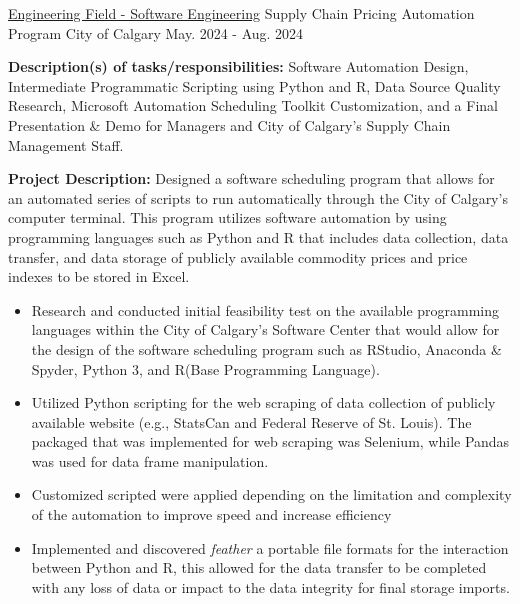 \begin{cventries}
  \cventry
    {\href{https://github.com/TevHeath}{Engineering Field - Software Engineering}} %
    {Supply Chain Pricing Automation Program} %
    {City of Calgary} %
    {May. 2024 - Aug. 2024} %
     {\renewcommand{\labelitemii}{\bullet}
      \begin{cvitems} \textbf{Description(s) of tasks/responsibilities:} Software Automation Design, Intermediate Programmatic Scripting using Python and R, Data Source Quality Research, Microsoft Automation Scheduling Toolkit Customization, and a Final Presentation \& Demo for Managers and City of Calgary's Supply Chain Management Staff.
         \item {\textbf{Project Description:} Designed a software scheduling program that allows for an automated series of scripts to run automatically through the City of Calgary's computer terminal. This program utilizes software automation by using programming languages such as Python and R that includes data collection, data transfer, and data storage of publicly available commodity prices and price indexes to be stored in Excel.}
        \begin{itemize} 
          \item Research and conducted initial feasibility test on the available programming languages within the City of Calgary's Software Center that would allow for the design of the software scheduling program such as RStudio, Anaconda \& Spyder, Python 3, and R(Base Programming Language).
          \item Utilized Python scripting for the web scraping of data collection of publicly available website (e.g., StatsCan and Federal Reserve of St. Louis). The packaged that was implemented for web scraping was Selenium, while Pandas was used for data frame manipulation. 
          \item Customized scripted were applied depending on the limitation and complexity of the automation to improve speed and increase efficiency
          \item Implemented and discovered \textit{feather} a portable file formats for the interaction between Python and R, this allowed for the data transfer to be completed with any loss of data or impact to the data integrity for final storage imports.
        \end{itemize}
      \end{cvitems}
    }


\end{cventries}
